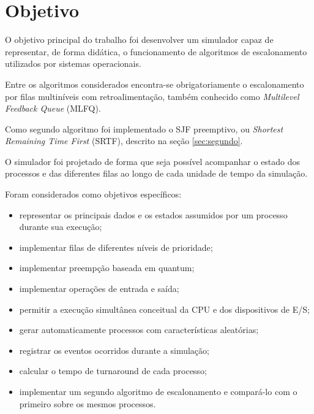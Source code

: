 \documentclass[12pt,a4paper]{article}
\begin{document}
\section{Objetivo}

O objetivo principal do trabalho foi desenvolver um simulador capaz
de representar, de forma didática, o funcionamento de algoritmos de
escalonamento utilizados por sistemas operacionais.

Entre os algoritmos considerados encontra-se obrigatoriamente o
escalonamento por filas multiníveis com retroalimentação, também
conhecido como \textit{Multilevel Feedback Queue} (MLFQ).

Como segundo algoritmo foi implementado o SJF preemptivo, ou
\textit{Shortest Remaining Time First} (SRTF), descrito na seção
\ref{sec:segundo}.

O simulador foi projetado de forma que seja possível acompanhar o
estado dos processos e das diferentes filas ao longo de cada unidade
de tempo da simulação.

Foram considerados como objetivos específicos:

\begin{itemize}

    \item representar os principais dados e os estados assumidos por um processo durante sua execução;

    \item implementar filas de diferentes níveis de prioridade;

    \item implementar preempção baseada em quantum;

    \item implementar operações de entrada e saída;

    \item permitir a execução simultânea conceitual da CPU e dos
    dispositivos de E/S;

    \item gerar automaticamente processos com características
    aleatórias;

    \item registrar os eventos ocorridos durante a simulação;

    \item calcular o tempo de turnaround de cada processo;

    \item implementar um segundo algoritmo de escalonamento e
    compará-lo com o primeiro sobre os mesmos processos.

\end{itemize}
\end{document}
